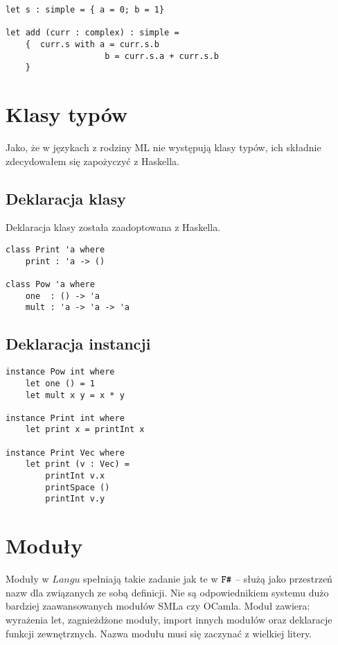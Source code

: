 \documentclass[declaration,shortabstract]{iithesis}
\begin{document}
\begin{lstlisting}[frame=single, caption=Uaktualnianie rekordu.]
let s : simple = { a = 0; b = 1}

let add (curr : complex) : simple = 
    {  curr.s with a = curr.s.b
                    b = curr.s.a + curr.s.b 
    }
\end{lstlisting}

\section{Klasy typów}

Jako, że w językach z rodziny ML nie występują klasy typów, ich składnie 
zdecydowałem się zapożyczyć z Haskella.

\subsection{Deklaracja klasy}

Deklaracja klasy została zaadoptowana z Haskella.

\begin{lstlisting}[frame=single, caption=Deklaracja klasy.]
class Print 'a where 
    print : 'a -> ()
  
class Pow 'a where 
    one  : () -> 'a
    mult : 'a -> 'a -> 'a
\end{lstlisting}

\subsection{Deklaracja instancji}

\begin{lstlisting}[frame=single, caption=Instancja klasy.]
instance Pow int where
    let one () = 1 
    let mult x y = x * y

instance Print int where 
    let print x = printInt x 

instance Print Vec where 
    let print (v : Vec) = 
        printInt v.x 
        printSpace ()
        printInt v.y
\end{lstlisting}

\section{Moduły}

Moduły w $Langu$ spełniają takie zadanie jak te w $\verb!F#!$ -- służą jako 
przestrzeń nazw dla związanych ze sobą definicji. Nie są odpowiednikiem 
systemu dużo bardziej zaawansowanych modułów SMLa czy OCamla.
Moduł zawiera: wyrażenia let, zagnieżdżone moduły, import innych 
modułów oraz deklaracje funkcji zewnętrznych. Nazwa modułu musi się zaczynać 
z wielkiej litery. 
\end{document}
